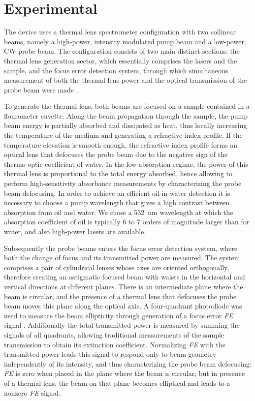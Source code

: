 \documentclass[9pt,twocolumn,twoside]{osajnl}
\newcommand{\FE}{\textit{FE}}
\begin{document}
\section{Experimental}
\label{Experimental}

The device uses a thermal lens spectrometer configuration with two collinear beams, namely a high-power, intensity modulated pump beam and a low-power, CW probe beam. The configuration consists of two main distinct sections: the thermal lens generation sector, which essentially comprises the lasers and the sample, and the focus error detection system, through which simultaneous measurement of both the thermal lens power and the optical transmission of the probe beam were made \cite{Domene2017}.

To generate the thermal lens, both beams are focused on a sample contained in a flourometer cuvette. Along the beam propagation through the sample, the pump beam energy is partially absorbed and dissipated as heat, thus locally increasing the temperature of the medium and generating a refractive index profile. If the temperature elevation is smooth enough, the refractive index profile forms an optical lens that defocuses the probe beam due to the negative sign of the thermo-optic coefficient of water. In the low-absorption regime, the power of this thermal lens is proportional to the total energy absorbed, hence allowing to perform high-sensitivity absorbance measurements by characterizing the probe beam defocusing. In order to achieve an efficient oil-in-water detection it is necessary to choose a pump wavelength that gives a high contrast between absorption from oil and water. We chose a \SI{532}{\nano\metre} wavelength at which the absorption coefficient of oil is typically \SI{6}{} to \SI{7}{} orders of magnitude larger than for water, and also high-power lasers are available.

Subsequently the probe beams enters the focus error detection system, where both the change of focus and its transmitted power are measured. The system comprises a pair of cylindrical lenses whose axes are oriented orthogonally, therefore creating an astigmatic focused beam with waists in the horizontal and vertical directions at different planes. There is an intermediate plane where the beam is circular, and the presence of a thermal lens that defocuses the probe beam moves this plane along the optical axis. A four-quadrant photodiode was used to measure the beam ellipticity through generation of a focus error \FE{} signal \cite{Domene2017, ZaldivarEscola2019}. Additionally the total transmitted power is measured by summing the signals of all quadrants, allowing traditional measurements of the sample transmission to obtain its extinction coefficient. Normalizing \FE{} with the transmitted power leads this signal to respond only to beam geometry independently of its intensity, and thus characterizing the probe beam defocusing: \FE{} is zero when placed in the plane where the beam is circular, but in presence of a thermal lens, the beam on that plane becomes elliptical and leads to a nonzero \FE{} signal. \\
\end{document}
